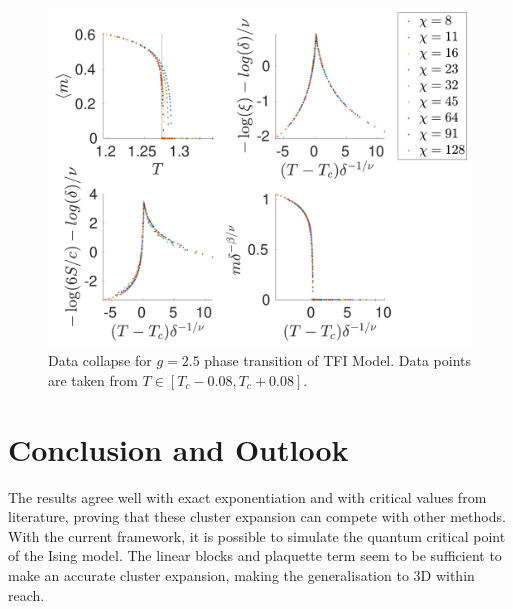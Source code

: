 \documentclass[twocolumn]{article}
\newcounter{a}
\newcounter{b}
\begin{document}
\begin{figure}[h!]
    \center
    \includegraphics[width=\linewidth]{../Figuren/phasediag/g25/zoomed_small.pdf}
    \caption{ Data collapse for $g=2.5$ phase transition of TFI  Model. Data points are taken from $T \in \left[ T_c -0.08, T_c +0.08 \right]$. }
    \label{fig:phase:g25:zoomed}
\end{figure}

\section{Conclusion and Outlook}

The results agree well with exact exponentiation and with critical values from literature, proving that these cluster expansion can compete with other methods. With the current framework, it is possible to simulate the quantum critical point of the Ising model. The linear blocks and plaquette term seem to be sufficient to make an accurate cluster expansion, making the generalisation to 3D within reach.

\small


\end{document}
